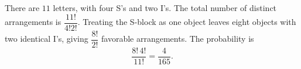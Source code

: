 There are $11$ letters, with four S's and two I's. The total number of distinct arrangements is $\dfrac{11!}{4!2!}$. Treating the S-block as one object leaves eight objects with two identical I's, giving $\dfrac{8!}{2!}$ favorable arrangements. The probability is
\[
\boxed{\dfrac{8!\,4!}{11!}=\dfrac{4}{165}}.
\]
